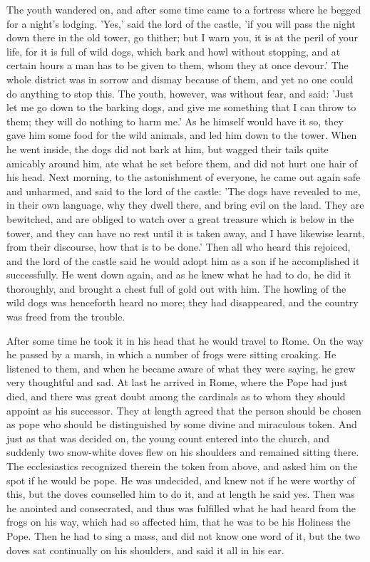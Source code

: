 \documentclass[12pt]{book}
\begin{document}
The youth wandered on, and after some time came to a fortress where he
begged for a night's lodging. 'Yes,' said the lord of the castle, 'if
you will pass the night down there in the old tower, go thither; but I
warn you, it is at the peril of your life, for it is full of wild
dogs, which bark and howl without stopping, and at certain hours a man
has to be given to them, whom they at once devour.' The whole district
was in sorrow and dismay because of them, and yet no one could do
anything to stop this. The youth, however, was without fear, and said:
'Just let me go down to the barking dogs, and give me something that I
can throw to them; they will do nothing to harm me.' As he himself
would have it so, they gave him some food for the wild animals, and
led him down to the tower. When he went inside, the dogs did not bark
at him, but wagged their tails quite amicably around him, ate what he
set before them, and did not hurt one hair of his head. Next morning,
to the astonishment of everyone, he came out again safe and unharmed,
and said to the lord of the castle: 'The dogs have revealed to me, in
their own language, why they dwell there, and bring evil on the land.
They are bewitched, and are obliged to watch over a great treasure
which is below in the tower, and they can have no rest until it is
taken away, and I have likewise learnt, from their discourse, how that
is to be done.' Then all who heard this rejoiced, and the lord of the
castle said he would adopt him as a son if he accomplished it
successfully. He went down again, and as he knew what he had to do, he
did it thoroughly, and brought a chest full of gold out with him. The
howling of the wild dogs was henceforth heard no more; they had
disappeared, and the country was freed from the trouble.

After some time he took it in his head that he would travel to Rome.
On the way he passed by a marsh, in which a number of frogs were
sitting croaking. He listened to them, and when he became aware of
what they were saying, he grew very thoughtful and sad. At last he
arrived in Rome, where the Pope had just died, and there was great
doubt among the cardinals as to whom they should appoint as his
successor. They at length agreed that the person should be chosen as
pope who should be distinguished by some divine and miraculous token.
And just as that was decided on, the young count entered into the
church, and suddenly two snow-white doves flew on his shoulders and
remained sitting there. The ecclesiastics recognized therein the token
from above, and asked him on the spot if he would be pope. He was
undecided, and knew not if he were worthy of this, but the doves
counselled him to do it, and at length he said yes. Then was he
anointed and consecrated, and thus was fulfilled what he had heard
from the frogs on his way, which had so affected him, that he was to
be his Holiness the Pope. Then he had to sing a mass, and did not know
one word of it, but the two doves sat continually on his shoulders,
and said it all in his ear.
\end{document}
